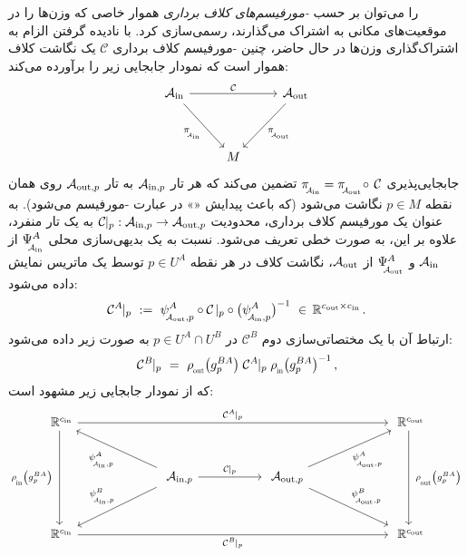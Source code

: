 \onexoneGMs را می‌توان بر حسب \emph{-مورفیسم‌های کلاف برداری} هموار خاصی که وزن‌ها را در موقعیت‌های مکانی به اشتراک می‌گذارند، رسمی‌سازی کرد.
با نادیده گرفتن الزام به اشتراک‌گذاری وزن‌ها در حال حاضر، چنین -مورفیسم کلاف برداری $\mathcal{C}$ یک نگاشت کلاف هموار است که نمودار جابجایی زیر را برآورده می‌کند:
\begin{equation}\label{eq:bundle_morphism_onexone}
    \begin{tikzcd}[row sep=3.5em, column sep=2.5em]
        \Ain
            \arrow[rd, "\piAin"']
            \arrow[rr, "\mathcal{C}"]
        & &
        \Aout
            \arrow[ld, "\piAout"]
        \\
        & M
    \end{tikzcd}
\end{equation}
جابجایی‌پذیری $\piAin = \piAout \!\circ\, \mathcal{C}$ تضمین می‌کند که هر تار $\mathcal{A}_{\textup{in},p}$ به تار $\mathcal{A}_{\textup{out},p}$ روی همان نقطه $p\in M$ نگاشت می‌شود (که باعث پیدایش «» در عبارت -مورفیسم می‌شود).
به عنوان یک مورفیسم کلاف برداری، محدودیت $\mathcal{C}\!\!\;|_p: \mathcal{A}_{\textup{in},p}\to\mathcal{A}_{\textup{out},p}$ به یک تار منفرد، علاوه بر این، به صورت خطی تعریف می‌شود.
نسبت به یک بدیهی‌سازی محلی $\PsiAin^A$ از $\mathcal{A}_\textup{in}$ و $\PsiAout^A$ از $\mathcal{A}_\textup{out}$، نگاشت کلاف در هر نقطه $p\in U^A$ توسط یک ماتریس نمایش داده می‌شود:
\begin{align}\label{eq:bundle_morphism_onexone_triv_local}
    \mathcal{C}^A\!\!\;|_p\ :=\  \psiAoutp^A \circ \mathcal{C}\!\;|_p \circ \big(\psiAinp^A\big)^{-1}\ \in\, \R^{\cout\times\cin} \,.
\end{align}
ارتباط آن با یک مختصاتی‌سازی دوم $\mathcal{C}^B$ در $p\in U^A\cap U^B$ به صورت زیر داده می‌شود:
\begin{align}\label{eq:onexone_gaugetrafo}
    \mathcal{C}^B\!\!\;|_p \ =\ \rhoout\big(g_p^{BA}\big)\; \mathcal{C}^A\!\!\;|_p\; \rhoin\big(g_p^{BA}\big)^{-1} \,,
\end{align}
که از نمودار جابجایی زیر مشهود است:
\begin{equation}
\begin{tikzcd}[column sep=65pt, row sep=30, font=\normalsize]
    \R^{\cin}
        \arrow[dd, "\rhoin\big(g_p^{BA}\big)\ "']
        \arrow[rrr, "\mathcal{C}^A\!\!\;|_p"]
    & &[-3ex] &
    \R^{\cout}
        \arrow[dd, "\ \rhoout\big(g_p^{BA}\big)"]
    \\
    &
    \Ainp
        \arrow[r, "\mathcal{C}\!\!\;|_p"]
        \arrow[ul, "\psiAinp^A"]
        \arrow[dl, "\psiAinp^B"']
    &
    \Aoutp
        \arrow[ur, "\psiAoutp^A"']
        \arrow[dr, "\psiAoutp^B"]
    \\
    \R^{\cin}
        \arrow[rrr, "\mathcal{C}^B\!\!\;|_p"']
    & & &
    \R^{\cout}
\end{tikzcd}
\end{equation}


